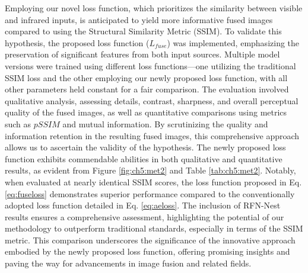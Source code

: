 Employing our novel loss function, which prioritizes the similarity between visible and infrared inputs, is anticipated to yield more informative fused images compared to using the Structural Similarity Metric (SSIM). To validate this hypothesis, the proposed loss function (\(L_{fuse}\)) was implemented, emphasizing the preservation of significant features from both input sources. Multiple model versions were trained using different loss functions—one utilizing the traditional SSIM loss and the other employing our newly proposed loss function, with all other parameters held constant for a fair comparison. The evaluation involved qualitative analysis, assessing details, contrast, sharpness, and overall perceptual quality of the fused images, as well as quantitative comparisons using metrics such as \(pSSIM\) and mutual information. By scrutinizing the quality and information retention in the resulting fused images, this comprehensive approach allows us to ascertain the validity of the hypothesis. The newly proposed loss function exhibits commendable abilities in both qualitative and quantitative results, as evident from Figure \ref{fig:ch5:met2} and Table \ref{tab:ch5:met2}. Notably, when evaluated at nearly identical SSIM scores, the loss function proposed in Eq. \ref{eq:fuseloss} demonstrates superior performance compared to the conventionally adopted loss function detailed in Eq. \ref{eq:aeloss}. The inclusion of RFN-Nest results ensures a comprehensive assessment, highlighting the potential of our methodology to outperform traditional standards, especially in terms of the SSIM metric. This comparison underscores the significance of the innovative approach embodied by the newly proposed loss function, offering promising insights and paving the way for advancements in image fusion and related fields.


